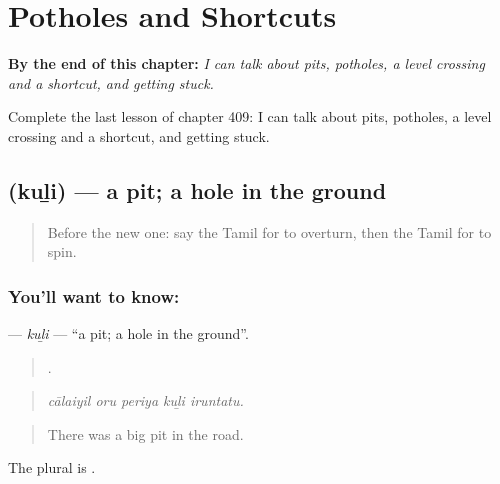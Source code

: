 
\chapter{Potholes and Shortcuts}
\label{ch:ta-potholes-and-shortcuts}

\begin{chapteropening}
\textbf{By the end of this chapter:} \emph{I can talk about pits, potholes, a level crossing and a shortcut, and getting stuck.}

Complete the last lesson of chapter 409: I can talk about pits, potholes, a level crossing and a shortcut, and getting stuck.
\end{chapteropening}

\section[\texorpdfstring{\ta{குழி} (kuḻi)}{குழி (kuḻi)}]{ (kuḻi) — a pit; a hole in the ground}

\label{lesson:TA-C409-kuli}



\begin{quote}
Before the new one: say the Tamil for to overturn, then the Tamil for to spin.
\end{quote}

\subsection*{You'll want to know: }
\textbf{} — \emph{kuḻi} — \textquotedblleft{}a pit; a hole in the ground\textquotedblright{}.

\begin{quote}
    .
\end{quote}

\begin{quote}
\emph{cālaiyil oru periya kuḻi iruntatu.}
\end{quote}

\begin{quote}
There was a big pit in the road.
\end{quote}

The plural is .

